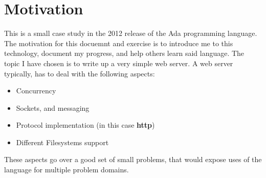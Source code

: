 \section{Motivation} 
This is a small case study in the 2012 release of the Ada programming language.
The motivation for this docuemnt and exercise is to introduce me to this 
technology, document my progress, and help others learn said language.
The topic I have chosen is to write up a very simple web server. A web server
typically, has to deal with the following aspects:
\begin{itemize}
\item Concurrency
\item Sockets, and messaging
\item Protocol implementation (in this case \textbf{http})
\item Different Filesystems support 
\end{itemize} 

These aspects go over a good set of small problems, that would expose uses of 
the language for multiple problem domains. 



